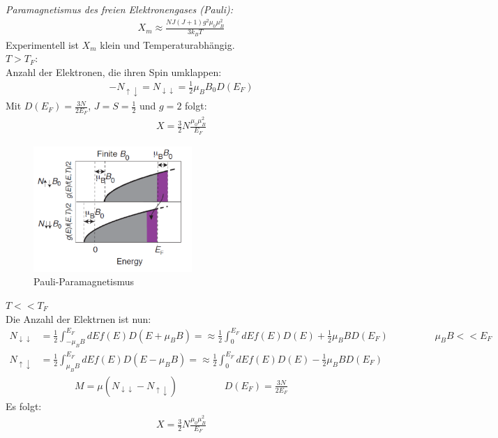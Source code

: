 \textit{Paramagnetismus des freien Elektronengases (Pauli):}\\
\begin{align}
    X_m \approx \frac{N J (J+1) g^2 \mu _0 \mu _B^2}{3 k_B T}
\end{align}
Experimentell ist $X_m$ klein und Temperaturabhängig. \bigskip\\

$T> T_F$:\\
Anzahl der Elektronen, die ihren Spin umklappen:
\begin{align}
    -N_{\uparrow \downarrow} = N_{\downarrow \downarrow} = \frac{1}{2} \mu_B B_0 D(E_F)
\end{align}
Mit $D(E_F) = \frac{3N}{2E_F}$, $J=S=\frac{1}{2}$ und $g=2$ folgt:
\begin{align}
    X = \frac{3}{2} N \frac{\mu_0 \mu_B^2}{E_F}
\end{align}

\begin{figure}[H]
    \centering
    \includegraphics[width=6cm]{resources/05-05-2015/Frage32_Pauli_Paramagnetismus.PNG}
    \caption{Pauli-Paramagnetismus}
\end{figure}

$T<<T_F$\\
Die Anzahl der Elektrnen ist nun:
\begin{align}
    N_{\downarrow \downarrow} &= \frac{1}{2} \int _{-\mu_B B} ^{E_F} dE f(E) D(E+ \mu_B B) = \approx \frac{1}{2} \int_0 ^{E_F} dE f(E) D(E) + \frac{1}{2} \mu_B B D(E_F) \hspace{2cm} \mu_B B << E_F \\
    N_{\uparrow \downarrow} &= \frac{1}{2} \int _{\mu_B B} ^{E_F} dE f(E) D(E- \mu_B B) = \approx \frac{1}{2} \int_0 ^{E_F} dE f(E) D(E) - \frac{1}{2} \mu_B B D(E_F) 
\end{align}
\begin{align}
    M = \mu (N_{\downarrow \downarrow} - N_{\uparrow \downarrow}) \hspace{2cm} D(E_F) = \frac{3N}{2 E_F}
\end{align}
Es folgt:
\begin{align}
    X = \frac{3}{2} N \frac{\mu_0 \mu_B^2}{E_F}
\end{align}



